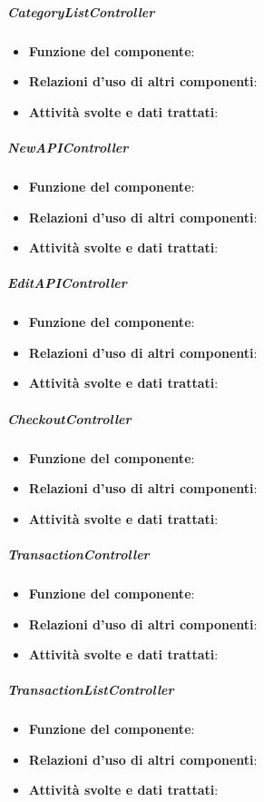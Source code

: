 \subparagraph{CategoryListController}
\begin{itemize}
	\item \textbf{Funzione del componente}: 
	\item \textbf{Relazioni d’uso di altri componenti}: 
	\item \textbf{Attività svolte e dati trattati}: 
\end{itemize}

\subparagraph{NewAPIController}
\begin{itemize}
	\item \textbf{Funzione del componente}: 
	\item \textbf{Relazioni d’uso di altri componenti}: 
	\item \textbf{Attività svolte e dati trattati}: 
\end{itemize}

\subparagraph{EditAPIController}
\begin{itemize}
	\item \textbf{Funzione del componente}: 
	\item \textbf{Relazioni d’uso di altri componenti}: 
	\item \textbf{Attività svolte e dati trattati}: 
\end{itemize}

\subparagraph{CheckoutController}
\begin{itemize}
	\item \textbf{Funzione del componente}: 
	\item \textbf{Relazioni d’uso di altri componenti}: 
	\item \textbf{Attività svolte e dati trattati}: 
\end{itemize}

\subparagraph{TransactionController}
\begin{itemize}
	\item \textbf{Funzione del componente}: 
	\item \textbf{Relazioni d’uso di altri componenti}: 
	\item \textbf{Attività svolte e dati trattati}: 
\end{itemize}

\subparagraph{TransactionListController}
\begin{itemize}
	\item \textbf{Funzione del componente}: 
	\item \textbf{Relazioni d’uso di altri componenti}: 
	\item \textbf{Attività svolte e dati trattati}: 
\end{itemize}

